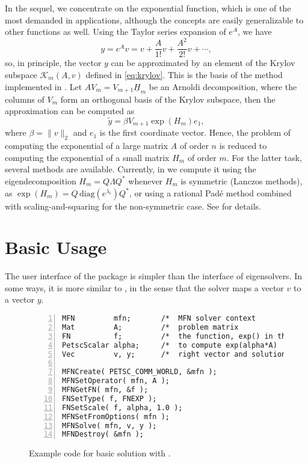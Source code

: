 In the sequel, we concentrate on the exponential function, which is one of the most demanded in applications, although the concepts are easily generalizable to other functions as well. Using the Taylor series expansion of $e^A$, we have
\begin{equation}
y=e^Av=v+\frac{A}{1!}v+\frac{A^2}{2!}v+\cdots,
\end{equation}
so, in principle, the vector $y$ can be approximated by an element of the Krylov subspace $\mathcal{K}_m(A,v)$ defined in \eqref{eq:krylov}. This is the basis of the method implemented in \expokit \citep{Sidje:1998:ESP}. Let $AV_m=V_{m+1}\underline{H}_m$ be an Arnoldi decomposition, where the columns of $V_m$ form an orthogonal basis of the Krylov subspace, then the approximation can be computed as
\begin{equation}
\tilde y=\beta V_{m+1}\exp(H_m)e_1,
\end{equation}
where $\beta=\|v\|_2$ and $e_1$ is the first coordinate vector. Hence, the problem of computing the exponential of a large matrix $A$ of order $n$ is reduced to computing the exponential of a small matrix $H_m$ of order $m$. For the latter task, several methods are available. Currently, in \slepc we compute it using the eigendecomposition $H_m=Q\Lambda Q^*$ whenever $H_m$ is symmetric (Lanczos methods), as $\exp(H_m)=Q\,\mathrm{diag}(e^{\lambda_i})Q^*$, or using a rational Pad\'e method combined with scaling-and-squaring for the non-symmetric case. See \citep{Higham:2010:CMF} for details.

\section{Basic Usage}

The user interface of the  package is simpler than the interface of eigensolvers. In some ways, it is more similar to , in the sense that the solver maps a vector $v$ to a vector $y$. 

\begin{figure}
\begin{Verbatim}[fontsize=\small,numbers=left,numbersep=6pt,xleftmargin=15mm]
MFN         mfn;       /*  MFN solver context                  */
Mat         A;         /*  problem matrix                      */
FN          f;         /*  the function, exp() in this example */
PetscScalar alpha;     /*  to compute exp(alpha*A)             */
Vec         v, y;      /*  right vector and solution           */

MFNCreate( PETSC_COMM_WORLD, &mfn );
MFNSetOperator( mfn, A );
MFNGetFN( mfn, &f );
FNSetType( f, FNEXP );
FNSetScale( f, alpha, 1.0 );
MFNSetFromOptions( mfn );
MFNSolve( mfn, v, y );
MFNDestroy( &mfn );
\end{Verbatim}
\caption{\label{fig:ex-mfn}Example code for basic solution with .}
\end{figure}

